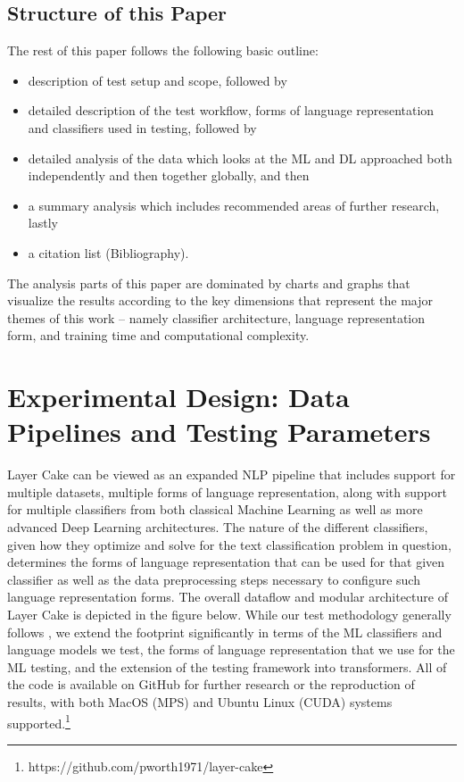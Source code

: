 \documentclass[final]{clv2025}
\begin{document}
\subsection{Structure of this Paper}
The rest of this paper follows the following basic outline:
\begin{itemize}
    \item description of test setup and scope, followed by
    \item detailed description of the test workflow, forms of language representation and classifiers used in testing, followed by
    \item detailed analysis of the data which looks at the ML and DL approached both independently and then together globally, and then
    \item a summary analysis which includes recommended areas of further research, lastly
    \item a citation list (Bibliography).
\end{itemize}

The analysis parts of this paper are dominated by charts and graphs that visualize the results according to the key dimensions that represent the major themes of this work – namely classifier architecture, language representation form, and training time and computational complexity.


\section{Experimental Design: Data Pipelines and Testing Parameters}

Layer Cake can be viewed as an expanded NLP pipeline that includes support for multiple datasets, multiple forms of language representation, along with support for multiple classifiers from both classical Machine Learning as well as more advanced Deep Learning architectures. The nature of the different classifiers, given how they optimize and solve for the text classification problem in question, determines the forms of language representation that can be used for that given classifier as well as the data preprocessing steps necessary to configure such language representation forms. The overall dataflow and modular architecture of Layer Cake is depicted in the figure below. While our test methodology generally follows \cite{moreo}, we extend the footprint significantly in terms of the ML classifiers and language models we test, the forms of language representation that we use for the ML testing, and the extension of the testing framework into transformers. All of the code is available on GitHub for further research or the reproduction of results, with both MacOS (MPS) and Ubuntu Linux (CUDA) systems supported.\footnote{https://github.com/pworth1971/layer-cake}
\end{document}
